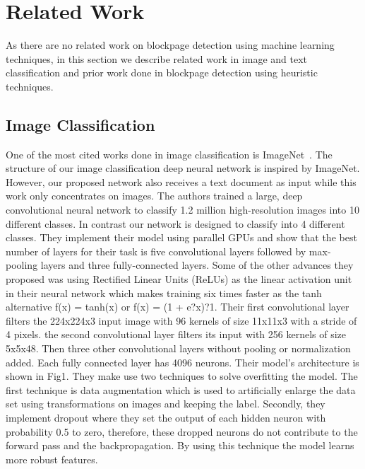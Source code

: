 \documentclass{article} %
\begin{document}
\section{Related Work}
As there are no related work on blockpage detection using machine learning techniques, in this section we describe related work in image and text classification and prior work done in blockpage detection using heuristic techniques.
\subsection{Image Classification}
One of the most cited works done in image classification is ImageNet~\cite{imagehinton}. The structure of our image classification deep neural network is inspired by ImageNet. However, our proposed network also receives a text document as input while this work only concentrates on images.
The authors trained a large, deep convolutional neural network to classify 1.2 million high-resolution images into 10 different classes. In contrast our network is designed to classify into 4 different classes.
They implement their model using parallel GPUs and show that the best number of layers for their task is five convolutional layers followed by max-pooling layers and three fully-connected layers. Some of the other advances they proposed was using Rectified Linear Units (ReLUs) as the linear activation unit in their neural network which makes training six times faster as the tanh alternative  f(x) = tanh(x) or f(x) = (1 + e?x)?1. 
Their first convolutional layer filters the 224x224x3 input image with 96 kernels of size 11x11x3 with a stride of 4 pixels.
the second convolutional layer filters its input with 256 kernels of size 5x5x48. Then three other convolutional layers without pooling or normalization added. Each fully connected layer has 4096 neurons. Their model's architecture is shown in Fig1.
They make use two techniques to solve overfitting the model. The first technique is data augmentation which is used to artificially enlarge the data set using transformations on images and keeping the label. Secondly, they implement dropout where they set the output of each hidden neuron with probability 0.5 to zero, therefore, these dropped neurons do not contribute to the forward pass and the backpropagation. By using this technique the model learns more robust features.
\end{document}
